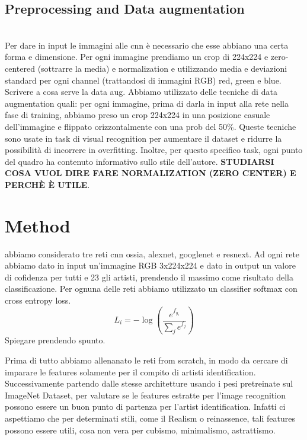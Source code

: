 \documentclass{article}
\begin{document}
\subsection{Preprocessing and Data augmentation}\mbox{}\\
Per dare in input le immagini alle cnn è necessario che esse abbiano una certa forma e dimensione. Per ogni immagine prendiamo un crop di 224x224 e zero-centered (sottrarre la media) e normalization e utilizzando media e deviazioni standard per ogni channel (trattandosi di immagini RGB) red, green e blue. \\
Scrivere a cosa serve la data aug. Abbiamo utilizzato delle tecniche di data augmentation quali: per ogni immagine, prima di darla in input alla rete nella fase di training, abbiamo preso un crop 224x224 in una posizione casuale dell'immagine e flippato orizzontalmente con una prob del 50\%. Queste tecniche sono usate in task di visual recognition per aumentare il dataset e ridurre la possibilità di incorrere in overfitting.
Inoltre, per questo specifico task, ogni punto del quadro ha contenuto informativo sullo stile dell'autore.
\textbf{STUDIARSI COSA VUOL DIRE FARE NORMALIZATION (ZERO CENTER) E PERCHÈ È UTILE}.

\section{Method}\label{method}
abbiamo considerato tre reti cnn ossia, alexnet, googlenet e resnext.
Ad ogni rete abbiamo dato in input un'immagine RGB 3x224x224 e dato in output un valore di cofidenza per tutti e 23 gli artisti, prendendo il massimo come risultato della classificazione. 
Per ognuna delle reti abbiamo utilizzato un classifier softmax con cross entropy loss.
\begin{equation}
L_{i}=-\log \left(\frac{e^{f_{y_{i}}}}{\sum_{j} e^{f_{j}}}\right)
\end{equation}
Spiegare prendendo spunto.

Prima di tutto abbiamo allenanato le reti from scratch, in modo da cercare di imparare le features solamente per il compito di artisti identification.\\
Successivamente partendo dalle stesse architetture usando i pesi pretreinate sul ImageNet Dataset, per valutare se le features estratte per l'image recognition possono essere un buon punto di partenza per l'artist identification. Infatti ci aspettiamo che per determinati stili, come il Realism o reinassence, tali features possono essere utili, cosa non vera per cubismo, minimalismo, astrattismo.
\end{document}
